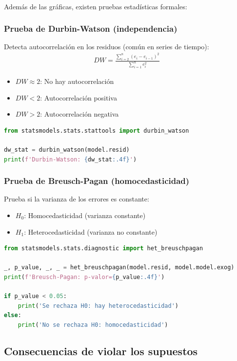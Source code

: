 Además de las gráficas, existen pruebas estadísticas formales:

\subsubsection{Prueba de Durbin-Watson (independencia)}

Detecta autocorrelación en los residuos (común en series de tiempo):
\begin{align}
	DW = \frac{\sum_{i=2}^{n} (e_i - e_{i-1})^2}{\sum_{i=1}^{n} e_i^2}
\end{align}

\begin{itemize}
	\item $DW \approx 2$: No hay autocorrelación
	\item $DW < 2$: Autocorrelación positiva
	\item $DW > 2$: Autocorrelación negativa
\end{itemize}

\begin{lstlisting}[language=Python]
from statsmodels.stats.stattools import durbin_watson

dw_stat = durbin_watson(model.resid)
print(f'Durbin-Watson: {dw_stat:.4f}')
\end{lstlisting}

\subsubsection{Prueba de Breusch-Pagan (homocedasticidad)}

Prueba si la varianza de los errores es constante:
\begin{itemize}
	\item $H_0$: Homocedasticidad (varianza constante)
	\item $H_1$: Heterocedasticidad (varianza no constante)
\end{itemize}

\begin{lstlisting}[language=Python]
from statsmodels.stats.diagnostic import het_breuschpagan

_, p_value, _, _ = het_breuschpagan(model.resid, model.model.exog)
print(f'Breusch-Pagan: p-valor={p_value:.4f}')

if p_value < 0.05:
    print('Se rechaza H0: hay heterocedasticidad')
else:
    print('No se rechaza H0: homocedasticidad')
\end{lstlisting}

\subsection{Consecuencias de violar los supuestos}

